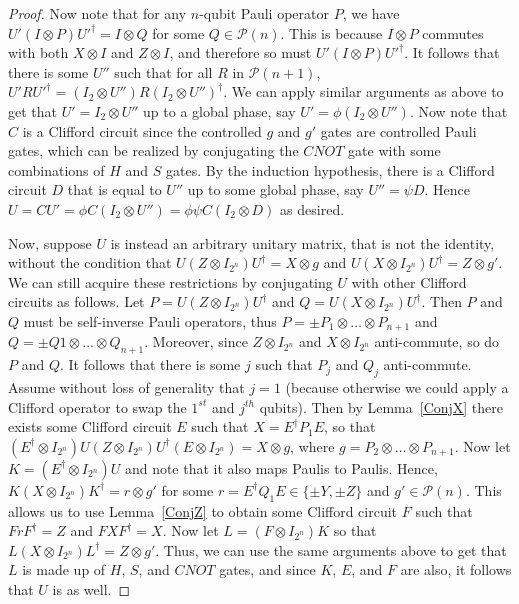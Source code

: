 \documentclass[12pt]{dalthesis}
\begin{document}
\begin{proof}
Now note that for any $n$-qubit Pauli operator $P$, we have $U'(I \otimes P) U'^\dag = I \otimes Q$ for some $Q \in \mathcal{P}(n)$. This is because $I\otimes P$ commutes with both $X \otimes I$ and $Z \otimes I$, and therefore so must $U' (I \otimes P) U'^\dag$. It follows that there is some $U''$ such that for all $R$ in $\mathcal{P}(n+1)$, $U'RU'^\dag = (I_2 \otimes U'')R(I_2 \otimes U'')^\dag$. We can apply similar arguments as above to get that $U' = I_2 \otimes U''$ up to a global phase, say $U' = \phi (I_2 \otimes U'')$. Now note that $C$ is a Clifford circuit since the controlled $g$ and $g'$ gates are controlled Pauli gates, which can be realized by conjugating the $CNOT$ gate with some combinations of $H$ and $S$ gates. By the induction hypothesis, there is a Clifford circuit $D$ that is equal to $U''$ up to some global phase, say $U'' = \psi D$. Hence $U = CU' = \phi C (I_2 \otimes U'' ) = \phi \psi C(I_2 \otimes D)$ as desired.

Now, suppose $U$ is instead an arbitrary unitary matrix, that is not the identity, without the condition that $U(Z \otimes I_{2^n})U^{\dag} = X \otimes g$ and $U(X \otimes I_{2^n})U^{\dag} = Z \otimes g'$. We can still acquire these restrictions by conjugating $U$ with other Clifford circuits as follows. Let $P = U(Z \otimes I_{2^n}) U^\dag$ and $Q = U(X \otimes I_{2^n}) U^\dag$. Then $P$ and $Q$ must be self-inverse Pauli operators, thus $P = \pm P_1 \otimes \dots \otimes P_{n+1}$ and $Q = \pm Q1 \otimes \dots \otimes Q_{n+1}$. Moreover, since $Z \otimes I_{2^n}$ and $X \otimes I_{2^n}$ anti-commute, so do $P$ and $Q$. It follows that there is some $j$ such that $P_j$ and $Q_j$ anti-commute. Assume without loss of generality that $j=1$ (because otherwise we could apply a Clifford operator to swap the $1^{st}$ and $j^{th}$ qubits). Then by Lemma~\ref{ConjX} there exists some Clifford circuit $E$ such that $X = E^\dag P_1 E$, so that $(E^\dag \otimes I_{2^n})U(Z \otimes I_{2^n})U^{\dag}(E \otimes I_{2^n}) = X \otimes g$, where $g = P_2 \otimes \dots \otimes P_{n+1}$. Now let $K = (E^\dag \otimes I_{2^n})U$ and note that it also maps Paulis to Paulis. Hence, $K(X \otimes I_{2^n})K^{\dag} = r \otimes g'$ for some $r = E^\dag Q_1E \in \{ \pm Y, \pm Z \}$ and $g' \in \mathcal{P}(n)$. This allows us to use Lemma~\ref{ConjZ} to obtain some Clifford circuit $F$ such that $FrF^\dag = Z$ and $FXF^\dag = X$. Now let $L = (F \otimes I_{2^n})K$ so that $L(X \otimes I_{2^n})L^\dag = Z \otimes g'$. Thus, we can use the same arguments above to get that $L$ is made up of $H$, $S$, and $CNOT$ gates, and since $K$, $E$, and $F$ are also, it follows that $U$ is as well.
\end{proof}
\end{document}
